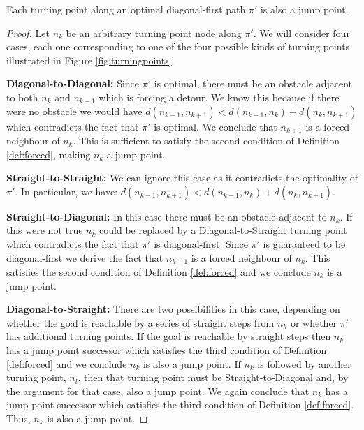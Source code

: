 \begin{lemma}
\label{lemma:turningpoints}
Each turning point along an optimal diagonal-first path $\pi'$ is also a jump point.
\end{lemma}
\begin{proof}
Let $n_{k}$ be an arbitrary turning point node along $\pi'$. 
We will consider four cases, each one corresponding to one of the four
possible kinds of turning points illustrated in Figure \ref{fig:turningpoints}. 

\textbf{Diagonal-to-Diagonal:} Since $\pi'$ is optimal, there must be an
obstacle adjacent to both $n_{k}$ and $n_{k-1}$ which is forcing a detour.
We know this because if there were no obstacle we would have 
$d(n_{k-1}, n_{k+1}) < d(n_{k-1}, n_{k}) + d(n_{k}, n_{k+1})$ which contradicts
the fact that $\pi'$ is optimal.
We conclude that $n_{k+1}$ is a forced neighbour of $n_{k}$.
This is sufficient to satisfy the second condition of Definition
\ref{def:forced}, making $n_{k}$ a jump point.

\textbf{Straight-to-Straight:} We can ignore this case as it contradicts the 
optimality of $\pi'$. In particular, we have: 
$d(n_{k-1}, n_{k+1}) < d(n_{k-1}, n_{k}) + d(n_{k}, n_{k+1})$.

\textbf{Straight-to-Diagonal:} In this case there must be an 
obstacle adjacent to $n_{k}$. 
If this were not true $n_{k}$ could be replaced by a
Diagonal-to-Straight turning point which contradicts the fact that $\pi'$ is
diagonal-first.
Since $\pi'$ is guaranteed to be diagonal-first we derive the fact that $n_{k+1}$ is 
a forced neighbour of $n_{k}$.
This satisfies the second condition of Definition \ref{def:forced} and we conclude
$n_{k}$ is a jump point.

\textbf{Diagonal-to-Straight:} There are two possibilities in this case, 
depending on whether the goal is reachable by a series of straight steps
from $n_{k}$ or whether $\pi'$ has additional turning points. If the goal
is reachable by straight steps then $n_{k}$ has a jump point successor which satisfies the
third condition of Definition \ref{def:forced} and we conclude $n_{k}$ is
also a jump point.
If $n_{k}$ is followed by another turning point, $n_{l}$, then that turning
point must be Straight-to-Diagonal and, by the argument for that case, 
also a jump point.
We again conclude that $n_{k}$ has a jump point successor which satisfies
the third condition of Definition \ref{def:forced}. Thus, $n_{k}$ is
also a jump point.
\end{proof}

